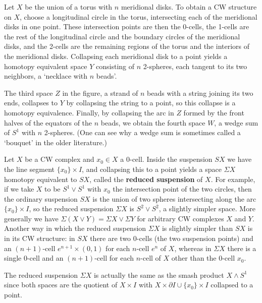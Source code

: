 \begin{example}
\label{ex:torus-meridional-disks-necklace}
Let $X$ be the union of a torus with $n$ meridional disks. To obtain a CW structure
on $X$, choose a longitudinal circle in the torus, intersecting each of the meridional
disks in one point. These intersection points are then the 0-cells, the 1-cells are the
rest of the longitudinal circle and the boundary circles of the meridional disks, and
the 2-cells are the remaining regions of the torus and the interiors of the meridional
disks. Collapsing each meridional disk to a point yields a homotopy equivalent space
$Y$ consisting of $n$ 2-spheres, each tangent to its two neighbors, a `necklace with $n$
beads'.



The third space $Z$ in the figure, a strand of $n$ beads with a string joining its two
ends, collapses to $Y$ by collapsing the string to a point, so this collapse is a homotopy
equivalence. Finally, by collapsing the arc in $Z$ formed by the front halves of the
equators of the $n$ beads, we obtain the fourth space $W$, a wedge sum of $S^1$ with $n$
2-spheres. (One can see why a wedge sum is sometimes called a `bouquet' in the older
literature.)
\end{example}

\begin{example}
\label{ex:reduced-suspension}
Let $X$ be a CW complex and $x_0 \in X$ a 0-cell. Inside the suspension $SX$ we
have the line segment $\{x_0\} \times I$, and collapsing this to a point yields a space
$\Sigma X$ homotopy equivalent to $SX$, called the \textbf{reduced suspension} of $X$. For
example, if we take $X$ to be $S^1 \vee S^1$ with $x_0$ the intersection point of the two
circles, then the ordinary suspension $SX$ is the union of two spheres intersecting
along the arc $\{x_0\} \times I$, so the reduced suspension $\Sigma X$ is $S^2 \vee S^2$, a slightly
simpler space. More generally we have $\Sigma(X \vee Y) = \Sigma X \vee \Sigma Y$ for arbitrary CW
complexes $X$ and $Y$. Another way in which the reduced suspension $\Sigma X$ is slightly
simpler than $SX$ is in its CW structure: in $SX$ there are two 0-cells (the two
suspension points) and an $(n+1)$-cell $e^{n+1} \times (0,1)$ for each $n$-cell $e^n$ of $X$,
whereas in $\Sigma X$ there is a single 0-cell and an $(n+1)$-cell for each $n$-cell of $X$
other than the 0-cell $x_0$.

The reduced suspension $\Sigma X$ is actually the same as the smash product
$X \wedge S^1$ since both spaces are the quotient of $X \times I$ with
$X \times \partial I \cup \{x_0\} \times I$ collapsed to a point.
\end{example}


